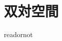 \documentclass{jsarticle}
\begin{document}
\fi

\section{双対空間}

\expandafter\ifx\csname readornot\endcsname\relax
  
\end{document}
